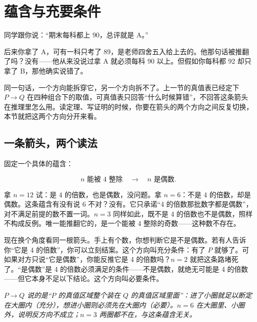 \section{蕴含与充要条件}
\label{sec:01-Mathematical-Language/01-Logic/02}

同学跟你说：``期末每科都上 90，总评就是 A。''

后来你拿了 A，可有一科只考了 89，是老师四舍五入给上去的。他那句话被推翻了吗？没有——他从来没说过拿 A 就必须每科 90 以上。但假如你每科都 92 却只拿了 B，那他确实说错了。

同一句话，一个方向能拆穿它，另一个方向拆不了。上一节的真值表已经定下 \(P\to Q\) 在四种组合下的取值，可真值表只回答``什么时候算错''，不回答这条箭头在推理里怎么用。读定理、写证明的时候，你要在箭头的两个方向之间反复切换，本节就把这两个方向分开来看。

\subsection{一条箭头，两个读法}

固定一个具体的蕴含：

\[
n\text{ 能被 4 整除}\quad\longrightarrow\quad n\text{ 是偶数}.
\]

拿 \(n=12\) 试：是 4 的倍数，也是偶数，没问题。拿 \(n=6\)：不是 4 的倍数，却是偶数。这条蕴含有没有说 6 不对？没有。它只承诺``4 的倍数那批数字都是偶数''，对不满足前提的数不置一词。\(n=3\) 同样如此，既不是 4 的倍数也不是偶数，照样不构成反例。唯一能推翻它的，是一个能被 4 整除的奇数——这种数不存在。

现在换个角度看同一根箭头。手上有个数，你想判断它是不是偶数。若有人告诉你``它是 4 的倍数''，你可以立刻结案。这个方向叫充分条件：有了 \(P\) 就够了。可如果对方只说``它是偶数''，你能反推它是 4 的倍数吗？\(n=2\) 就把这条路堵死了。``是偶数''是 4 的倍数必须满足的条件——不是偶数，就绝无可能是 4 的倍数——但它本身不足以下结论。这个方向叫必要条件。

\begin{center}

\emph{\(P\to Q\) 说的是``\(P\) 的真值区域整个装在 \(Q\) 的真值区域里面''：进了小圈就足以断定在大圈内（充分），想进小圈则必须先在大圈内（必要）。\(n=6\) 在大圈里、小圈外，说明反方向不成立；\(n=3\) 两圈都不在，与这条蕴含无关。}
\end{center}

